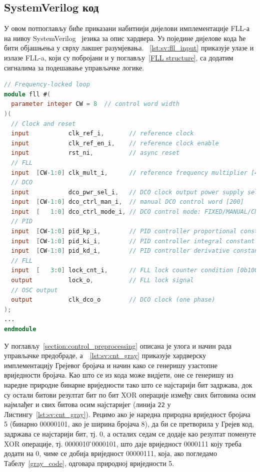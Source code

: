 \documentclass[master]{finthesis}
\newcommand*{\prog}[1]{\texttt{#1}}
\def \FLL  {FLL} %
\begin{document}
\subsection{SystemVerilog код}
У овом потпоглављу биће приказани набитнији дијелови имплементације \FLL-а на нивоу SystemVerilog~\cite{SystemVerilog:1800-2023} језика за опис хардвера. Уз поједине дијелове кода ће бити објашњења у сврху лакшег разумјевања. \lstlistingname~\ref{lst:sv:fll_input} приказује улазе и излазе \FLL-a, који су побројани и у поглављу~\ref{FLL structure}, са додатим сигналима за подешавање управљачке логике. \par 
\begin{lstlisting}[language=Verilog, caption={Улазни и излазни сигнали хијерархијски највишег \FLL\ модула.}, label={lst:sv:fll_input}]
 // Frequency-locked loop
module fll #(
  parameter integer CW = 8  // control word width
)(
  // Clock and reset
  input           clk_ref_i,       // reference clock
  input           clk_ref_en_i,    // reference clock enable
  input           rst_ni,          // async reset
  // FLL
  input  [CW-1:0] clk_mult_i,      // reference frequency multiplier [40]
  // DCO
  input           dco_pwr_sel_i,   // DCO clock output power supply selection: VDDL/VDD [0/1]
  input  [CW-1:0] dco_ctrl_man_i,  // manual DCO control word [200]
  input  [   1:0] dco_ctrl_mode_i, // DCO control mode: FIXED/MANUAL/CNT/PID [3/2]
  // PID
  input  [CW-1:0] pid_kp_i,        // PID controller proportional constant [0b01000000]
  input  [CW-1:0] pid_ki_i,        // PID controller integral constant [0b01000000]
  input  [CW-1:0] pid_kd_i,        // PID controller derivative constant [0]
  // FLL
  input  [   3:0] lock_cnt_i,      // FLL lock counter condition [0b1000]
  output          lock_o,          // FLL lock signal
  // OSC output
  output          clk_dco_o        // DCO clock (one phase)
);
...
endmodule
\end{lstlisting}
У поглављу~\ref{section:control_preprocessing} описана је улога и начин рада управљачке предобраде, а~\lstlistingname~\ref{lst:sv:cnt_gray} приказује хардверску имплементацију Грејевог бројача и начин како се генеришу узастопне вриједности бројача. Као што се из кода може видјети, оне се генеришу из наредне природне бинарне вриједности тако што се најстарији бит задржава, док су остали битови резултат бит по бит XOR операције између свих битовима осим најмлађег и свих битова осим најстаријег (линија \prog{22} у Листингу~\ref{lst:sv:cnt_gray}). Рецимо ако је наредна природна вриједност бројача 5 (бинарно 00000101, ако је ширина бројача 8), да би се претворила у Грејев код, задржава се најстарији бит, тј. 0, а осталих седам се додаје као резултат поменуте XOR операције, тј. 0000010\,\^\,0000101, што даје вриједност 0000111 коју треба додати на 0, чиме се добија вриједност 00000111, која, ако погледамо Табелу~\ref{gray_code}, одговара природној вриједности 5. \par
\end{document}
